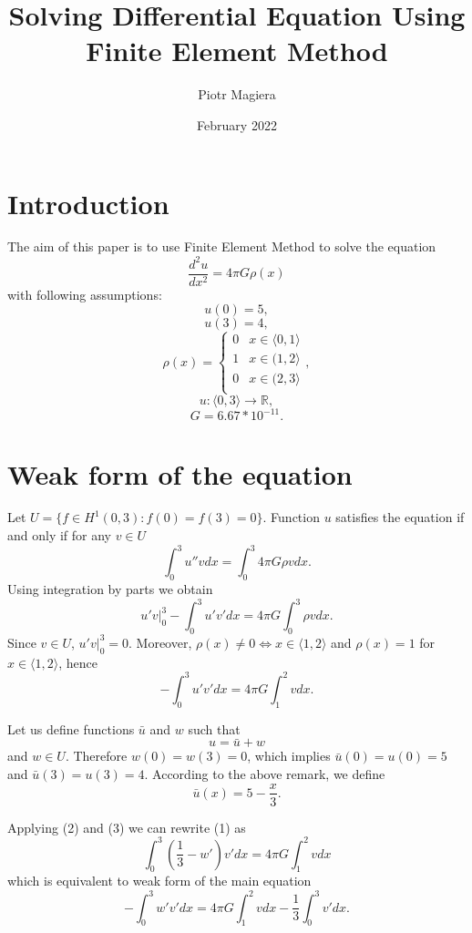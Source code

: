 \documentclass[12pt]{article}
\title{Solving Differential Equation Using Finite Element Method}
\author{Piotr Magiera}
\date{February 2022}
\begin{document}
\maketitle

\section{Introduction}

The aim of this paper is to use Finite Element Method to solve the equation
\[\frac{d^2 u}{dx^2}=4\pi G\rho (x)\]
with following assumptions:
\[u(0)=5,\]
\[u(3)=4,\]
\[\rho(x)=\begin{cases} 
      0 & x \in \langle0, 1 \rangle\\
      1 & x \in (1, 2 \rangle\\
      0 & x \in (2, 3 \rangle\\
   \end{cases},\]
\[u: \langle 0, 3 \rangle \to \mathbb{R},\]
\[G = 6.67 * 10^{-11}.\]


\section{Weak form of the equation}


Let $U=\{f\in H^1(0, 3): f(0)=f(3)=0\}$. Function $u$ satisfies the equation if and only if for any $v \in U$
\[\int_0^3 u'' v dx=\int_0^3 4 \pi G \rho v dx.\]
Using integration by parts we obtain
\[u'v\Big|_0^3 - \int_{0}^3 u' v' dx =4 \pi G \int_0^3 \rho v dx.\]
Since $v \in U$, $u'v\Big|_0^3=0$. Moreover, $\rho(x) \neq 0 \iff x \in \langle 1, 2 \rangle$ 
and  $\rho(x) = 1$ for $x \in \langle 1, 2 \rangle$, hence
\begin{equation}- \int_0^3 u' v' dx = 4 \pi G \int_1^2 v dx.\end{equation}


\indent
Let us define functions $\bar u$ and $w$ such that 
\begin{equation} u = \bar u + w \end{equation} 
and $w \in U$. Therefore $w(0)=w(3)=0$, which implies 
$\bar u(0) = u(0) = 5$ and $\bar u(3) = u(3) = 4$. According to the above remark, we define
\begin{equation} \bar u(x) = 5 - \frac{x}{3}.\end{equation}

\pagebreak[4]

\noindent
Applying (2) and (3) we can rewrite (1) as
\[\int_0^3 (\frac{1}{3} - w') v' dx = 4 \pi G \int_1^2 v dx\]
which is equivalent to weak form of the main equation
\begin{equation} - \int_0^3 w' v' dx = 4 \pi G \int_1^2 v dx -  \frac{1}{3} \int_0^3 v' dx.\end{equation}
\end{document}
